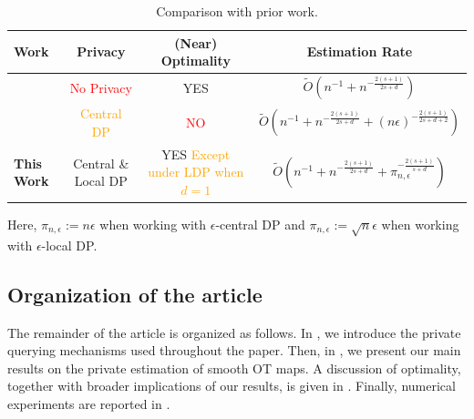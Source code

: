 \documentclass{article}
\newcommand\green[1]{\textcolor{ao(english)}{#1}}
\newcommand\red[1]{\textcolor{red}{#1}}
\newcommand\orange[1]{\textcolor{orange}{#1}}
\newcommand{\1}{\mathds{1}}
\theoremstyle{plain}
\theoremstyle{definition}
\theoremstyle{remark}
\begin{document}
\begin{table}[h!]
\caption{Comparison with prior work.}
\label{tableComparisonResults}
\vskip 0.15in
\begin{center}
\begin{small}
\begin{sc}
\begin{tabular}{lccc}
\toprule
Work & Privacy &  (Near) Optimality & Estimation Rate \\
\midrule
\cite{hutter2021minimax,Manole2024Plugin,balakrishnan2025stabilityboundssmoothoptimal}   & \red{No Privacy}&  \green{YES} & \tiny{$\tilde{O} \left( n^{-1} + n^{- \frac{2 (s+1)}{2 s + d}} \right)$}\\
\midrule
{\cite{lalanne2025PrivateOTMaps}}   & \orange{Central DP} &  \red{NO} & \tiny{$\tilde{O} \left( n^{-1} + n^{- \frac{2 (s+1)}{2 s + d}} + (n \epsilon)^{-\frac{2(s+1)}{2s+d + 2}} \right)$}\\
\midrule
\textbf{This Work}   & \green{Central \& Local DP} &  \shortstack[c]{\green{YES} \\ \tiny{\orange{Except under}} \\ \tiny{\orange{LDP when $d=1$\footnotemark}}} & \tiny{$\tilde{O} \left( n^{-1} + n^{- \frac{2 (s+1)}{2 s + d}} + \pi_{n, \epsilon}^{- \frac{2 (s+1)}{ s + d}} \right)$} \\
\bottomrule
\end{tabular}
\end{sc}
\end{small}
\end{center}
Here, $\pi_{n, \epsilon} := n \epsilon$ when working with $\epsilon$-central DP and $\pi_{n, \epsilon} := \sqrt{n} \epsilon$ when working with $\epsilon$-local DP.
\vskip -0.2in
\end{table}


\subsection{Organization of the article}

The remainder of the article is organized as follows. In , we introduce the private querying mechanisms used throughout the paper. Then, in , we present our main results on the private estimation of smooth OT maps. A discussion of optimality, together with broader implications of our results, is given in . Finally, numerical experiments are reported in .
\end{document}
